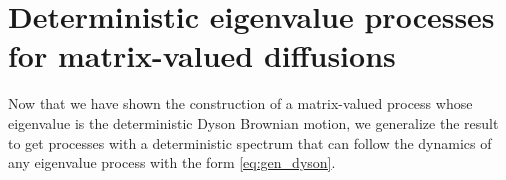\section{Deterministic eigenvalue processes for matrix-valued diffusions}

Now that we have shown the construction of a matrix-valued process whose eigenvalue is the deterministic Dyson Brownian motion, we generalize the result to get processes with a deterministic spectrum that can follow the dynamics of any eigenvalue process with the form \eqref{eq:gen_dyson}.


    
    




